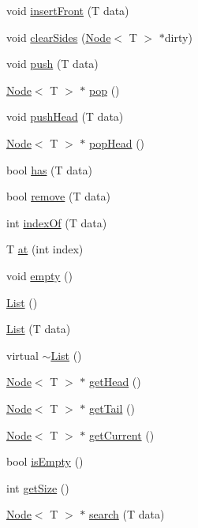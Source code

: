 \begin{DoxyCompactItemize}
void \hyperlink{class_list_ad1f90c530106d07bf59b80d5113e78cd}{insert\+Front} (T data)
\item 
void \hyperlink{class_list_ae026c56757ce1a696274813c00033404}{clear\+Sides} (\hyperlink{class_node}{Node}$<$ T $>$ $\ast$dirty)
\item 
void \hyperlink{class_list_a7aedb99ebfb318e7e847ab80a1c0207c}{push} (T data)
\item 
\hyperlink{class_node}{Node}$<$ T $>$ $\ast$ \hyperlink{class_list_a985cb6f2b506e9d30e8fa59b39d44efd}{pop} ()
\item 
void \hyperlink{class_list_a52150cf0b88cd75787c64753add000ae}{push\+Head} (T data)
\item 
\hyperlink{class_node}{Node}$<$ T $>$ $\ast$ \hyperlink{class_list_ae216f7a997b0c9fc0e1d89f241b9f5b2}{pop\+Head} ()
\item 
bool \hyperlink{class_list_a1af3f7dea5bb7e693675795312256f71}{has} (T data)
\item 
bool \hyperlink{class_list_a104d8a6b2b3f64149acb31c2e3073bed}{remove} (T data)
\item 
int \hyperlink{class_list_a94c0b5278992ef8d6830a14732157440}{index\+Of} (T data)
\item 
T \hyperlink{class_list_ab96ccb71dbe8292d4a4e64c73fb03ff0}{at} (int index)
\item 
void \hyperlink{class_list_a34bb861c7093434bc48473a20cf7b157}{empty} ()
\item 
\hyperlink{class_list_a5c5e27671b21b3815d4e25b953c69454}{List} ()
\item 
\hyperlink{class_list_a054ab94d95915e2a3b8945cbdf51a42b}{List} (T data)
\item 
virtual \hyperlink{class_list_a3336fbf244b9fc7ed6aeb8ee0d4a9e85}{$\sim$\+List} ()
\item 
\hyperlink{class_node}{Node}$<$ T $>$ $\ast$ \hyperlink{class_list_a786c0ed42a576a1c56b20ab892f51d27}{get\+Head} ()
\item 
\hyperlink{class_node}{Node}$<$ T $>$ $\ast$ \hyperlink{class_list_aeadc86b707f794159f58a63aadd43947}{get\+Tail} ()
\item 
\hyperlink{class_node}{Node}$<$ T $>$ $\ast$ \hyperlink{class_list_a53de13994a40e64c7ded3937d519c991}{get\+Current} ()
\item 
bool \hyperlink{class_list_a73f8b1d313382daffeeeed552f42da2f}{is\+Empty} ()
\item 
int \hyperlink{class_list_ae2afa15a07b88a3a678969522cc14988}{get\+Size} ()
\item 
\hyperlink{class_node}{Node}$<$ T $>$ $\ast$ \hyperlink{class_list_af6e64cae6cfa23efd13be7c1ee1bff75}{search} (T data)

\end{DoxyCompactItemize}
